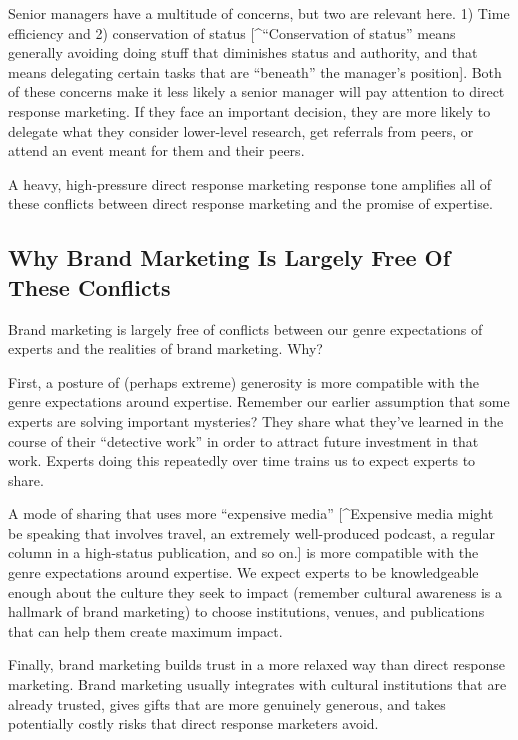 \documentclass[13pt,]{tufte-handout}
\begin{document}
Senior managers have a multitude of concerns, but two are relevant here.
1) Time efficiency and 2) conservation of status {[}\^{}``Conservation
of status'' means generally avoiding doing stuff that diminishes status
and authority, and that means delegating certain tasks that are
``beneath'' the manager's position{]}. Both of these concerns make it
less likely a senior manager will pay attention to direct response
marketing. If they face an important decision, they are more likely to
delegate what they consider lower-level research, get referrals from
peers, or attend an event meant for them and their peers.

A heavy, high-pressure direct response marketing response tone amplifies
all of these conflicts between direct response marketing and the promise
of expertise.

\hypertarget{why-brand-marketing-is-largely-free-of-these-conflicts}{%
\subsection{Why Brand Marketing Is Largely Free Of These
Conflicts}\label{why-brand-marketing-is-largely-free-of-these-conflicts}}

Brand marketing is largely free of conflicts between our genre
expectations of experts and the realities of brand marketing. Why?

First, a posture of (perhaps extreme) generosity is more compatible with
the genre expectations around expertise. Remember our earlier assumption
that some experts are solving important mysteries? They share what
they've learned in the course of their ``detective work'' in order to
attract future investment in that work. Experts doing this repeatedly
over time trains us to expect experts to share.

A mode of sharing that uses more ``expensive media'' {[}\^{}Expensive
media might be speaking that involves travel, an extremely well-produced
podcast, a regular column in a high-status publication, and so on.{]} is
more compatible with the genre expectations around expertise. We expect
experts to be knowledgeable enough about the culture they seek to impact
(remember cultural awareness is a hallmark of brand marketing) to choose
institutions, venues, and publications that can help them create maximum
impact.

Finally, brand marketing builds trust in a more relaxed way than direct
response marketing. Brand marketing usually integrates with cultural
institutions that are already trusted, gives gifts that are more
genuinely generous, and takes potentially costly risks that direct
response marketers avoid.
\end{document}

